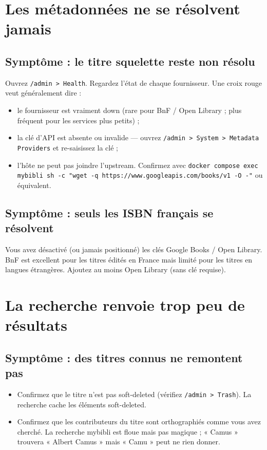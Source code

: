 \section{Les métadonnées ne se résolvent jamais}

\subsection*{Symptôme : le titre squelette reste non résolu}

Ouvrez \texttt{/admin > Health}. Regardez l'état de chaque
fournisseur. Une croix rouge veut généralement dire :

\begin{itemize}
  \item le fournisseur est vraiment down (rare pour BnF / Open
        Library ; plus fréquent pour les services plus petits) ;
  \item la clé d'API est absente ou invalide — ouvrez
        \texttt{/admin > System > Metadata Providers} et re-saisissez
        la clé ;
  \item l'hôte ne peut pas joindre l'upstream. Confirmez avec
        \texttt{docker compose exec mybibli sh -c "wget -q
        https://www.googleapis.com/books/v1 -O -"} ou équivalent.
\end{itemize}

\subsection*{Symptôme : seuls les ISBN français se résolvent}

Vous avez désactivé (ou jamais positionné) les clés Google Books /
Open Library. BnF est excellent pour les titres édités en France
mais limité pour les titres en langues étrangères. Ajoutez au
moins Open Library (sans clé requise).

\section{La recherche renvoie trop peu de résultats}

\subsection*{Symptôme : des titres connus ne remontent pas}

\begin{itemize}
  \item Confirmez que le titre n'est pas soft-deleted (vérifiez
        \texttt{/admin > Trash}). La recherche cache les éléments
        soft-deleted.
  \item Confirmez que les contributeurs du titre sont orthographiés
        comme vous avez cherché. La recherche mybibli est floue
        mais pas magique ; « Camus » trouvera « Albert Camus »
        mais « Camu » peut ne rien donner.
\end{itemize}

